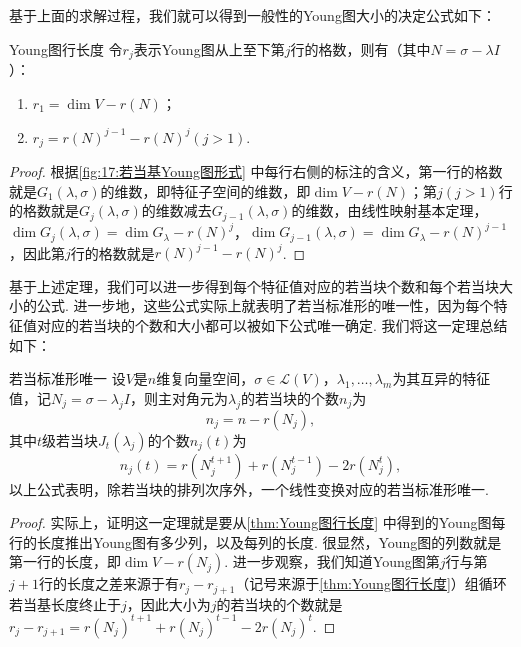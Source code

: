 基于上面的求解过程，我们就可以得到一般性的Young图大小的决定公式如下：
\begin{theorem}{}{Young图行长度}
    令$r_j$表示Young图从上至下第$j$行的格数，则有（其中$N=\sigma-\lambda I$）：
    \begin{enumerate}
        \item $r_1=\dim V-r(N)$；
        \item $r_j=r(N)^{j-1}-r(N)^j(j>1)$.
    \end{enumerate}
\end{theorem}
\begin{proof}
    根据\autoref{fig:17:若当基Young图形式} 中每行右侧的标注的含义，第一行的格数就是$G_1(\lambda,\sigma)$的维数，即特征子空间的维数，即$\dim V-r(N)$；第$j(j>1)$行的格数就是$G_j(\lambda,\sigma)$的维数减去$G_{j-1}(\lambda,\sigma)$的维数，由线性映射基本定理，$\dim G_j(\lambda,\sigma)=\dim G_\lambda-r(N)^j$，$\dim G_{j-1}(\lambda,\sigma)=\dim G_\lambda-r(N)^{j-1}$，因此第$j$行的格数就是$r(N)^{j-1}-r(N)^j$.
\end{proof}

基于上述定理，我们可以进一步得到每个特征值对应的若当块个数和每个若当块大小的公式. 进一步地，这些公式实际上就表明了若当标准形的唯一性，因为每个特征值对应的若当块的个数和大小都可以被如下公式唯一确定. 我们将这一定理总结如下：
\begin{theorem}{}{若当标准形唯一}
    设$V$是$n$维复向量空间，$\sigma\in \mathcal{L}(V)$，$\lambda_1,\ldots,\lambda_m$为其互异的特征值，记$N_j=\sigma-\lambda_j I$，则主对角元为$\lambda_j$的若当块的个数$n_j$为
    \begin{equation} \label{eq:17:若当块个数}
        n_j=n-r(N_j),
    \end{equation}
    其中$t$级若当块$J_t(\lambda_j)$的个数$n_j(t)$为
    \begin{equation} \label{eq:17:若当块大小}
        n_j(t)=r(N_j^{t+1})+r(N_j^{t-1})-2r(N_j^t),
    \end{equation}
    以上公式表明，除若当块的排列次序外，一个线性变换对应的若当标准形唯一.
\end{theorem}
\begin{proof}
    实际上，证明这一定理就是要从\autoref{thm:Young图行长度} 中得到的Young图每行的长度推出Young图有多少列，以及每列的长度. 很显然，Young图的列数就是第一行的长度，即$\dim V-r(N_j)$. 进一步观察，我们知道Young图第$j$行与第$j+1$行的长度之差来源于有$r_j-r_{j+1}$（记号来源于\autoref{thm:Young图行长度}）组循环若当基长度终止于$j$，因此大小为$j$的若当块的个数就是$r_j-r_{j+1}=r(N_j)^{t+1}+r(N_j)^{t-1}-2r(N_j)^t$.
\end{proof}

